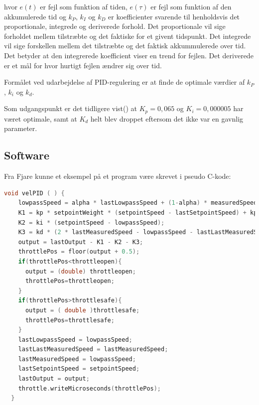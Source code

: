 hvor $e(t)$ er fejl som funktion af tiden, $e(\tau)$ er fejl som funktion af den akkumulerede tid og $k_P$, $k_I$ og $k_D$ er koefficienter svarende til henholdsvis det proportionale, integrede og deriverede forhold. Det proportionale vil sige forholdet mellem tilstræbte og det faktiske for et givent tidspunkt. Det integrede vil sige forskellen mellem det tilstræbte og det faktisk akkummulerede over tid. Det betyder at den integrerede koefficient viser en trend for fejlen. Det deriverede er et mål for hvor hurtigt fejlen ændrer sig over tid.

Formålet ved udarbejdelse af PID-regulering er at finde de optimale værdier af $k_P$, $k_i$ og $k_d$.


Som udgangspunkt er det tidligere vist(\autocite{pid1}) at $K_p=0,065$ og $K_i=0,000005$ har været optimale, samt at $K_d$ helt blev droppet eftersom det ikke var en gavnlig parameter.

\subsection{Software}
\label{sec:software}

Fra Fjare\autocite{pid1} kunne et eksempel på et program være skrevet i pseudo C-kode:
\begin{lstlisting}[language=C,basicstyle=\ttfamily,label={lst:pid1}]
  void velPID ( ) {
    lowpassSpeed = alpha * lastLowpassSpeed + (1-alpha) * measuredSpeed;
    K1 = kp * setpointWeight * (setpointSpeed - lastSetpointSpeed) + kp * (lastMeasuredSpeed - lowpassSpeed);
    K2 = ki * (setpointSpeed - lowpassSpeed);
    K3 = kd * (2 * lastMeasuredSpeed - lowpassSpeed - lastLastMeasuredSpeed);
    output = lastOutput - K1 - K2 - K3;
    throttlePos = floor(output + 0.5);
    if(throttlePos<throttleopen){
      output = (double) throttleopen;
      throttlePos=throttleopen;
    }
    if(throttlePos>throttlesafe){
      output = ( double )throttlesafe;
      throttlePos=throttlesafe;
    }
    lastLowpassSpeed = lowpassSpeed;
    lastLastMeasuredSpeed = lastMeasuredSpeed;
    lastMeasuredSpeed = lowpassSpeed;
    lastSetpointSpeed = setpointSpeed;
    lastOutput = output;
    throttle.writeMicroseconds(throttlePos);
  }
\end{lstlisting}

